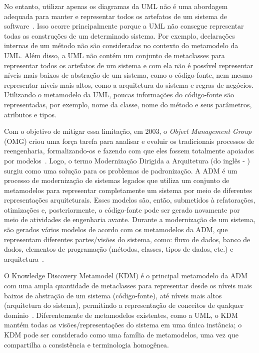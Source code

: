 No entanto, utilizar apenas os diagramas da UML não é uma abordagem adequada para manter e representar todos os artefatos de um sistema de software~\cite{Gorp, KolahdouzRahimi20145, revisao_sistematica_uml_refactoring}. Isso ocorre principalmente porque a UML não consegue representar todas as construções de um determinado sistema. Por exemplo, declarações internas de um método não são consideradas no contexto do metamodelo da UML. Além disso, a UML não contém um conjunto de metaclasses para representar todos os artefatos de um sistema e com ela não é possível representar níveis mais baixos de abstração de um sistema, como o código-fonte, nem mesmo representar níveis mais altos, como a arquitetura do sistema e regras de negócios. Utilizando o metamodelo da UML, poucas informações do código-fonte são representadas, por exemplo, nome da classe, nome do método e seus parâmetros, atributos e tipos.  

Com o objetivo de mitigar essa limitação, em 2003, o \textit{Object Management Group} (OMG) criou uma força tarefa para analisar e evoluir os tradicionais processos de reengenharia, formalizando-os e fazendo com que eles fossem totalmente apoiados por modelos~\cite{ADM:OMG}. Logo, o termo Modernização Dirigida a Arquitetura (do inglês - ) surgiu como uma solução para os problemas de padronização. A ADM é um processo de modernização de sistemas legados que utiliza um conjunto de metamodelos para representar completamente um sistema por meio de diferentes representações arquiteturais. Esses modelos são, então, submetidos à refatorações, otimizações e, posteriormente, o código-fonte pode ser gerado novamente por meio de atividades de engenharia avante. Durante a modernização de um sistema, são gerados vários modelos de acordo com os metamodelos da ADM, que representam diferentes partes/visões do sistema, como: fluxo de dados, banco de dados, elementos de programação (métodos, classes, tipos de dados, etc.) e arquitetura~\cite{PerezCastillo20121370}.

O Knowledge Discovery Metamodel (KDM) é o principal metamodelo da ADM com uma ampla quantidade de metaclasses para representar desde os níveis mais baixos de abstração de um sistema (código-fonte), até níveis mais altos (arquitetura do sistema), permitindo a representação de conceitos de qualquer domínio~\cite{KDM:specification,KDM:ISO}. Diferentemente de metamodelos existentes, como a UML, o KDM mantém todas as visões/representações do sistema em uma única instância; o KDM pode ser considerado como uma família de metamodelos, uma vez que compartilha a consistência e terminologia homogênea. 

